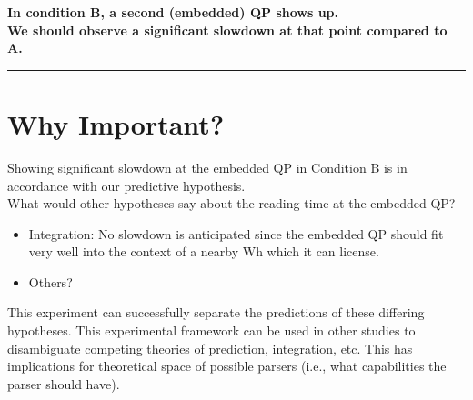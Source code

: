 \documentclass[12pt]{article}
\def\blank{\medskip\hrule\medskip}
\begin{document}

\begin{center}
\textbf{In condition B, a second (embedded) QP shows up. \\ We should observe a significant slowdown at that point compared to A.}
\end{center}


\blank

\section{Why Important?}
Showing significant slowdown at the embedded QP in Condition B is in accordance with our predictive hypothesis.\\

What would other hypotheses say about the reading time at the embedded QP?

\begin{itemize}
    \item Integration: No slowdown is anticipated since the embedded QP should fit very well into the context of
    a nearby Wh which it can license.
    \item Others?
\end{itemize}

This experiment can successfully separate the predictions of these differing hypotheses. This experimental
framework can be used in other studies to disambiguate competing theories of prediction, integration, etc.
This has implications for theoretical space of possible parsers (i.e., what capabilities the parser should have).
\end{document}
